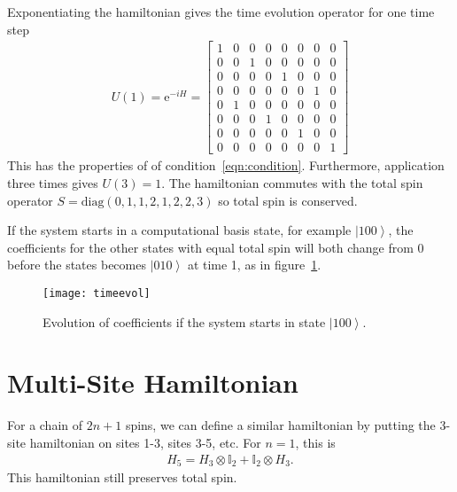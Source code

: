 \documentclass[11pt]{article}
\newcommand{\e}{\text{e}}
\newcommand{\ket}[1]{\left|#1\right\rangle}
\newcommand{\nn}{\nonumber\\}
\begin{document}

Exponentiating the hamiltonian gives the time evolution operator for one time step
\begin{align}
U(1) = \e^{-iH} = \begin{bmatrix}
	1 & 0 & 0 & 0 & 0 & 0 & 0 & 0 \\
	0 & 0 & 1 & 0 & 0 & 0 & 0 & 0 \\
	0 & 0 & 0 & 0 & 1 & 0 & 0 & 0 \\
	0 & 0 & 0 & 0 & 0 & 0 & 1 & 0 \\
	0 & 1 & 0 & 0 & 0 & 0 & 0 & 0 \\
	0 & 0 & 0 & 1 & 0 & 0 & 0 & 0 \\
	0 & 0 & 0 & 0 & 0 & 1 & 0 & 0 \\
	0 & 0 & 0 & 0 & 0 & 0 & 0 & 1
	\end{bmatrix}
\end{align}
This has the properties of of condition~\ref{eqn:condition}. Furthermore, application three times gives $U(3) = 1$. The hamiltonian commutes with the total spin operator $S = \text{diag}(0,1,1,2,1,2,2,3)$ so total spin is conserved.

If the system starts in a computational basis state, for example $\ket{100}$, the coefficients for the other states with equal total spin will both change from 0 before the states becomes $\ket{010}$ at time 1, as in figure~\ref{fig:timeevol}.
\begin{figure}
	\centering
	\texttt{[image: timeevol]}
	\caption{Evolution of coefficients if the system starts in state $\ket{100}$.}
	\label{fig:timeevol}
\end{figure}

\section{Multi-Site Hamiltonian}

For a chain of $2n+1$ spins, we can define a similar hamiltonian by putting the 3-site hamiltonian on sites 1-3, sites 3-5, etc. For $n=1$, this is
\begin{align}
H_5 = H_3\otimes\mathbb{I}_2 + \mathbb{I}_2\otimes H_3.
\end{align} 
This hamiltonian still preserves total spin. 
\end{document}
